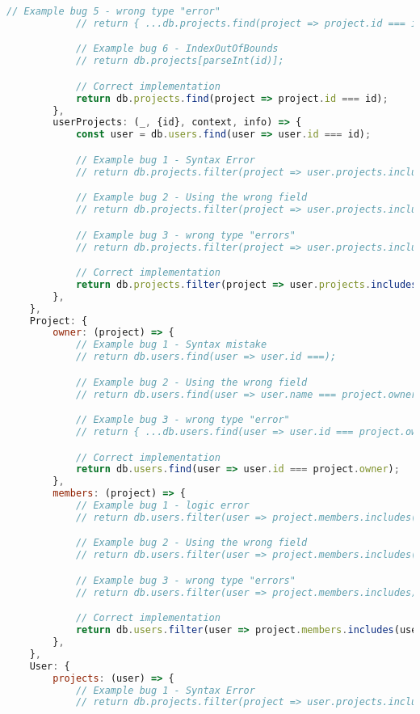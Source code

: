 \begin{lstlisting}[language=javascript]
            // Example bug 5 - wrong type "error"
            // return { ...db.projects.find(project => project.id === id), name: ["a", "b"] };

            // Example bug 6 - IndexOutOfBounds
            // return db.projects[parseInt(id)];

            // Correct implementation
            return db.projects.find(project => project.id === id);
        },
        userProjects: (_, {id}, context, info) => {
            const user = db.users.find(user => user.id === id);

            // Example bug 1 - Syntax Error
            // return db.projects.filter(project => user.projects.includes());

            // Example bug 2 - Using the wrong field
            // return db.projects.filter(project => user.projects.includes(project.name));

            // Example bug 3 - wrong type "errors"
            // return db.projects.filter(project => user.projects.includes);

            // Correct implementation
            return db.projects.filter(project => user.projects.includes(project.id));
        },
    },
    Project: {
        owner: (project) => {
            // Example bug 1 - Syntax mistake
            // return db.users.find(user => user.id ===);

            // Example bug 2 - Using the wrong field
            // return db.users.find(user => user.name === project.owner);

            // Example bug 3 - wrong type "error"
            // return { ...db.users.find(user => user.id === project.owner), name: ["a", "b"] };

            // Correct implementation
            return db.users.find(user => user.id === project.owner);
        },
        members: (project) => {
            // Example bug 1 - logic error
            // return db.users.filter(user => project.members.includes());

            // Example bug 2 - Using the wrong field
            // return db.users.filter(user => project.members.includes(user.name));

            // Example bug 3 - wrong type "errors"
            // return db.users.filter(user => project.members.includes);

            // Correct implementation
            return db.users.filter(user => project.members.includes(user.id));
        },
    },
    User: {
        projects: (user) => {
            // Example bug 1 - Syntax Error
            // return db.projects.filter(project => user.projects.includes());


\end{lstlisting}
